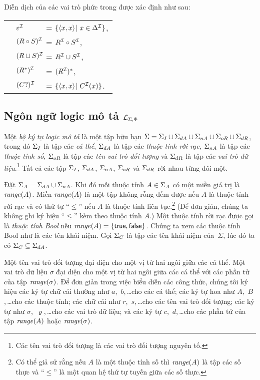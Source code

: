 Diễn dịch của các vai trò phức trong \ALCreg được xác định như sau:\\[1.0ex]
\begin{tabular}{c l l}
	& $\varepsilon^{\mathcal{I}}$ & =\; $\{\left\langle x,x\right\rangle\! \mid x \in \Delta^{\mathcal{I}}\}$,\\[0.5ex]
	& $(R \circ S)^{\mathcal{I}}\!\!\!\!\!$ & =\; $R^{\mathcal{I}} \circ S^{\mathcal{I}}$, \\[0.5ex]
	& $(R \sqcup S)^{\mathcal{I}}\!\!\!\!\!$ & =\; $R^{\mathcal{I}} \cup S^{\mathcal{I}}$, \\[0.5ex]
	& $(R^*)^{\mathcal{I}}$       & =\; $(R^{\mathcal{I}})^*$, \\[0.5ex]
	& $(C?)^{\mathcal{I}}$        & =\; $\{\left\langle x,x\right\rangle\! \mid C^{\mathcal{I}}(x)\}$.
\end{tabular}


\subsection{Ngôn ngữ logic mô tả $\mathcal{L}_{\Sigma,\Phi}$}
\label{sec:Chap1.LSPLanguage}

Một {\em bộ ký tự logic mô tả} là một tập hữu hạn $\Sigma = \Sigma_I \cup \Sigma_{dA} \cup \Sigma_{nA} \cup \Sigma_{oR} \cup \Sigma_{dR}$, trong đó $\Sigma_I$ là tập các {\em cá thể}, $\Sigma_{dA}$ là tập các {\em thuộc tính rời rạc}, $\Sigma_{nA}$ là tập các {\em thuộc tính số}, $\Sigma_{oR}$ là tập các {\em tên vai trò đối tượng} và $\Sigma_{dR}$ là tập các {\em vai trò dữ liệu}.\footnote{Các tên vai trò đối tượng là các vai trò đối tượng nguyên tố.} Tất cả các tập $\Sigma_I$, $\Sigma_{dA}$, $\Sigma_{nA}$, $\Sigma_{oR}$ và $\Sigma_{dR}$ rời nhau từng đôi một.

Đặt $\Sigma_A = \Sigma_{dA} \cup \Sigma_{nA}$. Khi đó mỗi thuộc tính $A \in \Sigma_A$ có một miền giá trị là $\mathit{range}(A)$. Miền $\mathit{range}(A)$ là một tập không rỗng đếm được nếu $A$ là thuộc tính rời rạc và có thứ tự ``$\leq$'' nếu $A$ là thuộc tính liên tục.\footnote{Có thể giả sử rằng nếu $A$ là một thuộc tính số thì $\mathit{range}(A)$ là tập các số thực và ``$\leq$'' là một quan hệ thứ tự tuyến giữa các số thực.} (Để đơn giản, chúng ta không ghi ký hiệu ``$\leq$'' kèm theo thuộc tính $A$.) 
%
Một thuộc tính rời rạc được gọi là {\em thuộc tính Bool} nếu $\mathit{range}(A) = \{\mathsf{true},\mathsf{false}\}$. Chúng ta xem các thuộc tính Bool như là các tên khái niệm. Gọi $\Sigma_C$ là tập các tên khái niệm của~$\Sigma$, lúc đó ta có $\Sigma_C \subseteq \Sigma_{dA}$.

Một tên vai trò đối tượng đại diện cho một vị từ hai ngôi giữa các cá thể. Một vai trò dữ liệu $\sigma$ đại diện cho một vị từ hai ngôi giữa các cá thể với các phần tử của tập $\mathit{range}(\sigma)$.
%
Để đơn giản trong việc biểu diễn các công thức, chúng tôi ký hiệu các ký tự chữ cái thường như $a$,~$b$,\,\ldots\;cho các cá thể; các ký tự hoa như $A$,~$B$,\,\ldots\;cho các thuộc tính; các chữ cái như $r$,~$s$,\,\ldots\;cho các tên vai trò đối tượng; các ký tự như $\sigma$,~$\varrho$,\,\ldots\;cho các vai trò dữ liệu; và các ký tự $c$,~$d$,\,\ldots\;cho các phần tử của tập $\mathit{range}(A)$ hoặc $\mathit{range}(\sigma)$.

